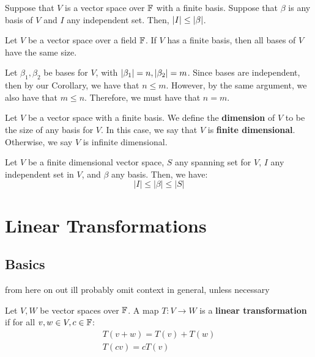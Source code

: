 \documentclass{article}
\begin{document}
\begin{crll}
Suppose that $ V $ is a vector space over $ \mathbb{F} $ with a finite basis. Suppose that $ \beta $ is any basis of $ V $ and $ I $ any independent set.
Then, $ \abs{I} \leq | \beta | $.
\end{crll}

\begin{thm}
Let $ V $ be a vector space over a field $ \mathbb{F} $. If $ V $ has a finite basis, then all bases of $ V $ have the same size.
\end{thm}

\begin{pf}[source=Primary Source Material]
Let $ \beta_{1}, \beta_{2} $ be bases for $ V $, with $ \abs{\beta_{1}} = n, \abs{\beta_{2}} = m $.
Since bases are independent, then by our Corollary, we have that $ n \leq m $. However, by the same argument, we also have that $ m \leq n $. \vsp
Therefore, we must have that $ n = m $.
\end{pf}

\begin{defn}
Let $ V $ be a vector space with a finite basis. We define the \textbf{dimension} of $ V $ to be the size of any basis for $ V $. \vsp
In this case, we say that $ V $ is \textbf{finite dimensional}. Otherwise, we say $ V $ is infinite dimensional.
\end{defn}

\begin{crll}
Let $ V $ be a finite dimensional vector space, $ S $ any spanning set for $ V $, $ I $ any independent set in $ V $, and $ \beta $ any basis. Then, we have:
\begin{equation*}
    |I| \leq |\beta| \leq |S|
\end{equation*}
\end{crll}

\newpage
\section{Linear Transformations}
\subsection{Basics}

from here on out ill probably omit context in general, unless necessary

\begin{defn}
Let $ V, W $ be vector spaces over $ \mathbb{F} $. A map $ T: V \rightarrow W $ is a \textbf{linear transformation} if for all $ v, w \in V, c \in \mathbb{F} $:
\begin{gather*}
T(v + w) = T(v) + T(w) \\
T(cv) = cT(v)
\end{gather*}
\end{defn}
\end{document}
